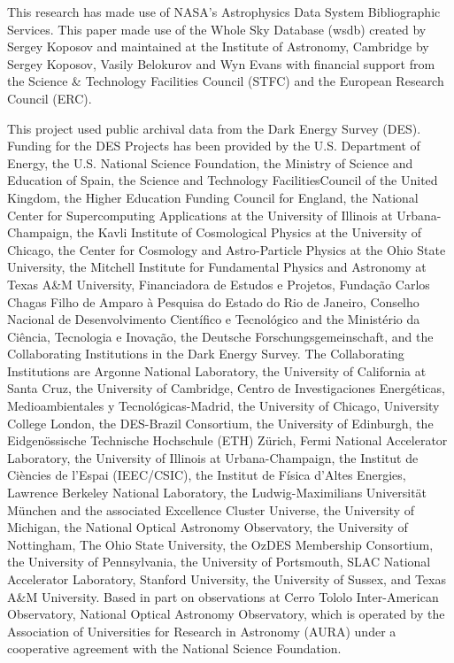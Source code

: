 \documentclass[twocolumn]{aastex63}
\begin{document}
This research has made use of NASA's Astrophysics Data System Bibliographic Services.
This paper made use of the Whole Sky Database (wsdb) created by Sergey Koposov and maintained at the Institute of Astronomy, Cambridge by Sergey Koposov, Vasily Belokurov and Wyn Evans with financial support from the Science \& Technology Facilities Council (STFC) and the European Research Council (ERC).

This project used public archival data from the Dark Energy Survey (DES). Funding for the DES Projects has been provided by the U.S. Department of Energy, the U.S. National Science Foundation, the Ministry of Science and Education of Spain, the Science and Technology FacilitiesCouncil of the United Kingdom, the Higher Education Funding Council for England, the National Center for Supercomputing Applications at the University of Illinois at Urbana-Champaign, the Kavli Institute of Cosmological Physics at the University of Chicago, the Center for Cosmology and Astro-Particle Physics at the Ohio State University, the Mitchell Institute for Fundamental Physics and Astronomy at Texas A\&M University, Financiadora de Estudos e Projetos, Funda{\c c}{\~a}o Carlos Chagas Filho de Amparo {\`a} Pesquisa do Estado do Rio de Janeiro, Conselho Nacional de Desenvolvimento Cient{\'i}fico e Tecnol{\'o}gico and the Minist{\'e}rio da Ci{\^e}ncia, Tecnologia e Inova{\c c}{\~a}o, the Deutsche Forschungsgemeinschaft, and the Collaborating Institutions in the Dark Energy Survey.
The Collaborating Institutions are Argonne National Laboratory, the University of California at Santa Cruz, the University of Cambridge, Centro de Investigaciones Energ{\'e}ticas, Medioambientales y Tecnol{\'o}gicas-Madrid, the University of Chicago, University College London, the DES-Brazil Consortium, the University of Edinburgh, the Eidgen{\"o}ssische Technische Hochschule (ETH) Z{\"u}rich,  Fermi National Accelerator Laboratory, the University of Illinois at Urbana-Champaign, the Institut de Ci{\`e}ncies de l'Espai (IEEC/CSIC), the Institut de F{\'i}sica d'Altes Energies, Lawrence Berkeley National Laboratory, the Ludwig-Maximilians Universit{\"a}t M{\"u}nchen and the associated Excellence Cluster Universe, the University of Michigan, the National Optical Astronomy Observatory, the University of Nottingham, The Ohio State University, the OzDES Membership Consortium, the University of Pennsylvania, the University of Portsmouth, SLAC National Accelerator Laboratory, Stanford University, the University of Sussex, and Texas A\&M University.
Based in part on observations at Cerro Tololo Inter-American Observatory, National Optical Astronomy Observatory, which is operated by the Association of Universities for Research in Astronomy (AURA) under a cooperative agreement with the National Science Foundation.
\end{document}
